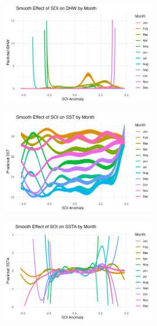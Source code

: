 \documentclass[letterpaper,9pt,twocolumn,twoside,]{pinp}
\begin{document}
\begin{center}
\includegraphics[width=0.5\textwidth]{report_images/soi_month_dhw.png}
\end{center}

\begin{center}
\includegraphics[width=0.5\textwidth]{report_images/soi_month_sst.png}
\end{center}

\begin{center}
\includegraphics[width=0.5\textwidth]{report_images/soi_month_ssta.png}
\end{center}





\end{document}

